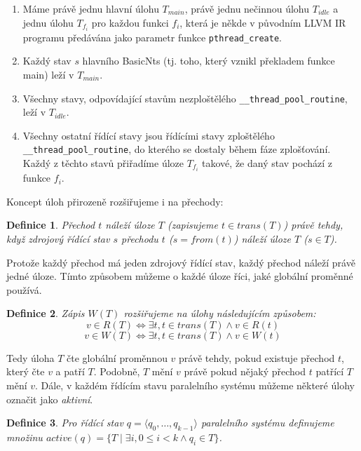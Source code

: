 \documentclass[12pt]{fithesis2}
\newtheorem{definition}{Definice}
\newcommand{\tuple}[1]{\langle #1 \rangle}
\newcommand{\suchthat}{\mid}
\begin{document}
\begin{enumerate}
\item Máme právě jednu hlavní úlohu $T_{\mathit{main}}$, právě jednu nečinnou úlohu $T_{\mathit{idle}}$ a jednu úlohu $T_{f_i}$ pro každou funkci $f_i$, která je někde v původním LLVM IR programu předávána jako parametr funkce \texttt{pthread\_create}.
\item Každý stav $s$ hlavního BasicNts (tj. toho, který vznikl překladem funkce main) leží v $T_{\mathit{main}}$.
\item Všechny stavy, odpovídající stavům nezploštělého \texttt{\_\_thread\_pool\_routine}, leží v $T_{\mathit{idle}}$.
\item Všechny ostatní řídící stavy jsou řídícími stavy zploštělého \texttt{\_\_thread\_pool\_routine}, do kterého se dostaly během fáze zplošťování. Každý z těchto stavů přiřadíme úloze $T_{f_i}$ takové, že daný stav pochází z funkce $f_i$.
\end{enumerate}


Koncept úloh přirozeně rozšiřujeme i na přechody:
\begin{definition}
Přechod $t$ náleží úloze $T$ (zapisujeme $t \in \mathit{trans}(T)$) právě tehdy, když zdrojový řídící stav $s$ přechodu $t$ ($s = \mathit{from}(t)$) náleží úloze $T$ ($s \in T$).
\end{definition}
Protože každý přechod má jeden zdrojový řídící stav, každý přechod náleží právě jedné úloze. Tímto způsobem můžeme o každé úloze říci, jaké globální proměnné používá.

\begin{definition}
Zápis $W(T)$ rozšiřujeme na úlohy následujícím způsobem:
\begin{equation*}
v \in R(T) \Leftrightarrow \exists t, t \in \mathit{trans}(T) \land v \in R(t)
\end{equation*}
\begin{equation*}
v \in W(T) \Leftrightarrow \exists t, t \in \mathit{trans}(T) \land v \in W(t)
\end{equation*}
\end{definition}
Tedy úloha $T$ čte globální proměnnou $v$ právě tehdy, pokud existuje přechod $t$, který čte $v$ a patří $T$. Podobně, $T$ mění $v$ právě pokud nějaký přechod $t$ patřící $T$ mění $v$.
Dále, v každém řídícím stavu paralelního systému můžeme některé úlohy označit jako \textit{aktivní}.
\begin{definition}
Pro řídící stav $q = \tuple{q_0, \ldots, q_{k-1}}$ paralelního systému definujeme množinu $\mathit{active}(q) = \{ T \suchthat \exists i, 0 \leq i < k \land q_i \in T \}$.
\end{definition}
\end{document}
